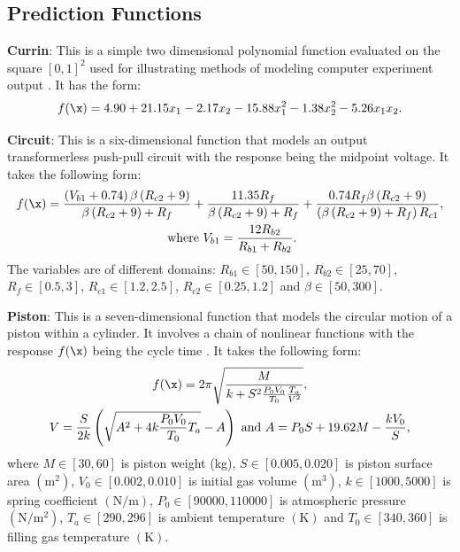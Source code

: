 \documentclass [PhD] {package/uclathes}
\begin{document}
\subsection{Prediction Functions}

\textbf{Currin}: This is a simple two dimensional polynomial function evaluated on the square $[0,1]^2$ used for illustrating methods of modeling computer experiment output \parencite{currin1991bayesian}. It has the form: %
\begin{equation*}
f(\x)=4.90+21.15 x_1-2.17 x_2-15.88 x_1^2-1.38 x_2^2-5.26 x_1 x_2 .
\end{equation*}


\textbf{Circuit}: This is a six-dimensional function that models an output transformerless push-pull circuit \parencite{simulationlib} with the response being the midpoint voltage. It takes the following form:
\begin{equation*}
\begin{gathered}
f(\x)=\frac{\left(V_{b 1}+0.74\right) \beta\left(R_{c 2}+9\right)}{\beta\left(R_{c 2}+9\right)+R_f}+\frac{11.35 R_f}{\beta\left(R_{c 2}+9\right)+R_f}+\frac{0.74 R_f \beta\left(R_{c 2}+9\right)}{\left(\beta\left(R_{c 2}+9\right)+R_f\right) R_{c 1}},  \\
\text { where } V_{b 1}=\frac{12 R_{b 2}}{R_{b 1}+R_{b 2}}.
\end{gathered}
\end{equation*}
The variables are of different domains: $R_{b1} \in [50, 150]$,  $R_{b2} \in [25, 70]$,  $R_{f} \in [0.5, 3]$,  $R_{c1} \in [1.2, 2.5]$,  $R_{c2} \in [0.25, 1.2]$ and  $\beta \in [50, 300]$.


\textbf{Piston}: This is a seven-dimensional function that models the circular motion of a piston within a cylinder. It involves a chain of nonlinear functions with the response $f(\x)$ being the cycle time \parencite{simulationlib}. It takes the following form:
\begin{equation*}
\begin{gathered}
f(\x)=2 \pi \sqrt{\frac{M}{k+S^2 \frac{P_0 V_0}{T_0} \frac{T_a}{V^2}}},  \\
 V=\frac{S}{2 k}\left(\sqrt{A^2+4 k \frac{P_0 V_0}{T_0} T_a}-A\right)
\text { and } A=P_0 S+19.62 M-\frac{k V_0}{S},
\end{gathered}
\end{equation*}
where $M \in[30,60]$ is piston weight (kg), $S \in[0.005,0.020]$ is piston surface area $\left(\mathrm{m}^2\right)$,  ${V}_0 \in[0.002,0.010]$ is initial gas volume $\left(\mathrm{m}^3\right)$, ${k} \in[1000,5000]$ is spring coefficient $(\mathrm{N} / \mathrm{m})$, $P_0 \in[90000,110000]$ is  atmospheric pressure $\left(\mathrm{N} / \mathrm{m}^2\right)$, ${T}_{{a}} \in[290,296]$ is ambient temperature $(\mathrm{K})$ and ${T}_0 \in[340,360]$ is filling gas temperature $(\mathrm{K})$.
\end{document}
